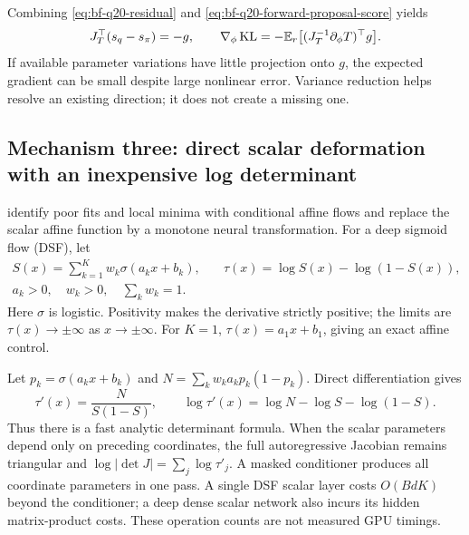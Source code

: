 Combining \eqref{eq:bf-q20-residual} and
\eqref{eq:bf-q20-forward-proposal-score} yields
\begin{equation}
 J_T^\top(s_q-s_\pi)=-g,\qquad
 \nabla_\phi\operatorname{KL}
 =-\mathbb{E}_r\big[(J_T^{-1}\partial_\phi T)^\top g\big].
 \label{eq:bf-q20-residual-projection}
\end{equation}
If available parameter variations have little projection onto $g$, the expected
gradient can be small despite large nonlinear error. Variance reduction helps
resolve an existing direction; it does not create a missing one.

\subsection{Mechanism three: direct scalar deformation with an inexpensive log determinant}

\citet[Sections 2--3 and 6.1.2]{huang2018naf} identify poor fits and local
minima with conditional affine flows and replace the scalar affine function
by a monotone neural transformation. For a deep sigmoid flow (DSF), let
\begin{equation}
 \begin{aligned}
 S(x)=\sum_{k=1}^{K}w_k\sigma(a_kx+b_k),\quad
 &\tau(x)=\log S(x)-\log(1-S(x)),\\
 a_k>0,\quad w_k>0,\quad\sum_kw_k=1.
 \end{aligned}
 \label{eq:bf-q20-dsf}
\end{equation}
Here $\sigma$ is logistic. Positivity makes the derivative strictly positive;
the limits are $\tau(x)\to\pm\infty$ as $x\to\pm\infty$. For $K=1$,
$\tau(x)=a_1x+b_1$, giving an exact affine control.

Let $p_k=\sigma(a_kx+b_k)$ and
$N=\sum_kw_ka_kp_k(1-p_k)$. Direct differentiation gives
\begin{equation}
 \tau'(x)=\frac{N}{S(1-S)},\qquad
 \log\tau'(x)=\log N-\log S-\log(1-S).
 \label{eq:bf-q20-dsf-logdet}
\end{equation}
Thus there is a fast analytic determinant formula. When the scalar parameters
depend only on preceding coordinates, the full autoregressive Jacobian remains
triangular and $\log|\det J|=\sum_j\log\tau'_j$. A masked conditioner
produces all coordinate parameters in one pass. A single DSF scalar layer costs
$O(BdK)$ beyond the conditioner; a deep dense scalar network also incurs its
hidden matrix-product costs. These operation counts are not measured GPU timings.

